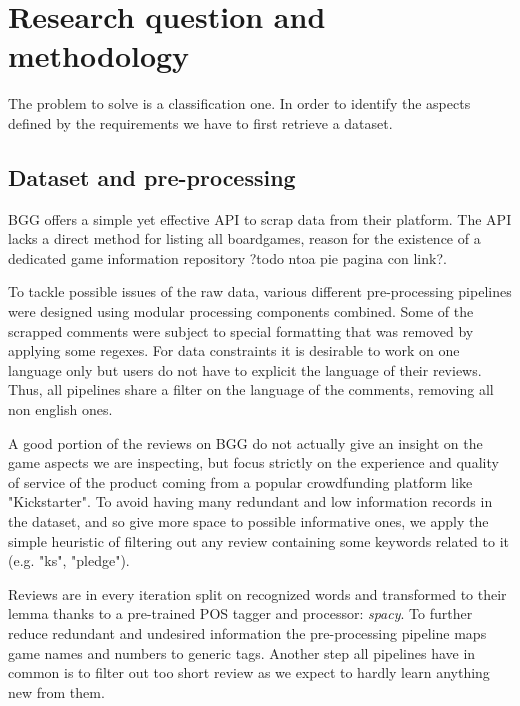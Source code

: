 \section{Research question and methodology}
The problem to solve is a classification one.
In order to identify the aspects defined by the requirements we have to first retrieve a dataset.

\subsection{Dataset and pre-processing}
BGG offers a simple yet effective API to scrap data from their platform.
The API lacks a direct method for listing all boardgames, reason for the existence of a dedicated game information
repository ?todo ntoa pie pagina con link?.

To tackle possible issues of the raw data, various different pre-processing pipelines were designed
using modular processing components combined.
Some of the scrapped comments were subject to special formatting that was removed by applying some regexes.
For data constraints it is desirable to work on one language only but users do not have to explicit the language of their reviews.
Thus, all pipelines share a filter on the language of the comments, removing all non english ones.

A good portion of the reviews on BGG do not actually give an insight on the game aspects we are inspecting,
but focus strictly on the experience and quality of service of the product coming from a popular crowdfunding platform like "Kickstarter".
To avoid having many redundant and low information records in the dataset, and so give more space to possible informative ones,
we apply the simple heuristic of filtering out any review containing some keywords related to it (e.g. "ks", "pledge").

Reviews are in every iteration split on recognized words and transformed to their lemma thanks to a pre-trained
POS tagger and processor: \textit{spacy}.
To further reduce redundant and undesired information the pre-processing pipeline maps game names and numbers to generic tags.
Another step all pipelines have in common is to filter out too short review as we expect to hardly learn anything new from them.

